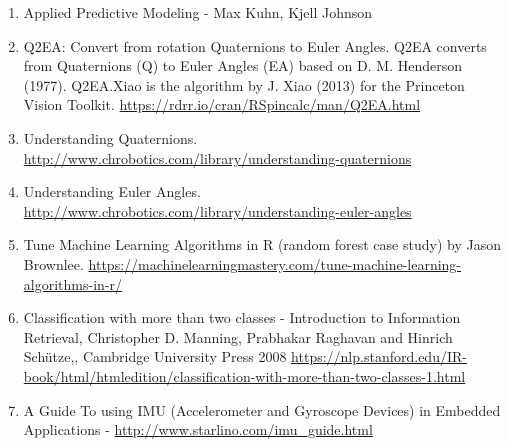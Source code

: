 \documentclass[]{article}
\begin{document}
\begin{enumerate}
\def\labelenumi{\arabic{enumi}.}
\item
  Applied Predictive Modeling - Max Kuhn, Kjell Johnson
\item
  Q2EA: Convert from rotation Quaternions to Euler Angles. Q2EA converts
  from Quaternions (Q) to Euler Angles (EA) based on D. M. Henderson
  (1977). Q2EA.Xiao is the algorithm by J. Xiao (2013) for the Princeton
  Vision Toolkit. \url{https://rdrr.io/cran/RSpincalc/man/Q2EA.html}
\item
  Understanding Quaternions.
  \url{http://www.chrobotics.com/library/understanding-quaternions}
\item
  Understanding Euler Angles.
  \url{http://www.chrobotics.com/library/understanding-euler-angles}
\item
  Tune Machine Learning Algorithms in R (random forest case study) by
  Jason Brownlee.
  \url{https://machinelearningmastery.com/tune-machine-learning-algorithms-in-r/}
\item
  Classification with more than two classes - Introduction to
  Information Retrieval, Christopher D. Manning, Prabhakar Raghavan and
  Hinrich Schütze,, Cambridge University Press 2008
  \url{https://nlp.stanford.edu/IR-book/html/htmledition/classification-with-more-than-two-classes-1.html}
\item
  A Guide To using IMU (Accelerometer and Gyroscope Devices) in Embedded
  Applications - \url{http://www.starlino.com/imu_guide.html}
\end{enumerate}
\end{document}
